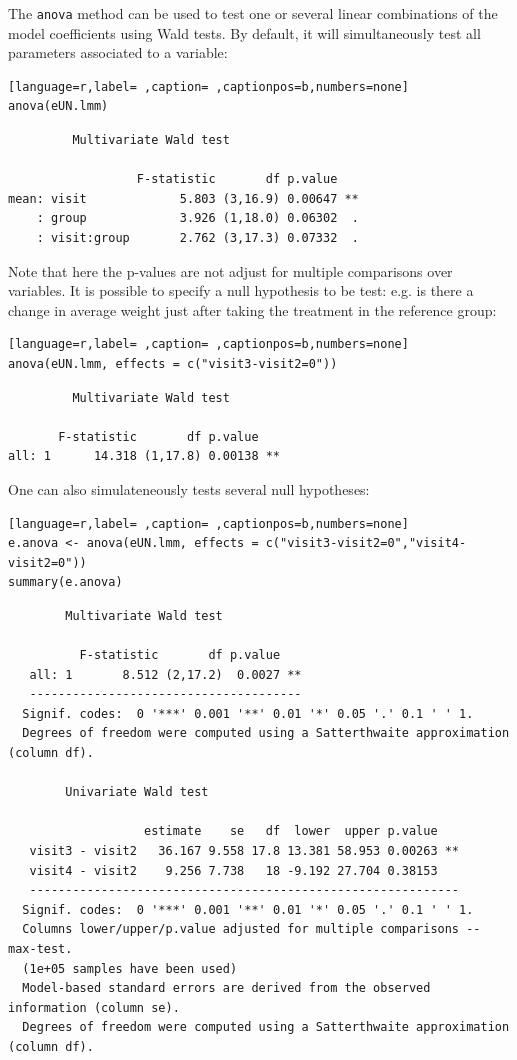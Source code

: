 \documentclass[12pt]{article}
\begin{document}
The \texttt{anova} method can be used to test one or several linear
combinations of the model coefficients using Wald tests. By default,
it will simultaneously test all parameters associated to a variable:
\begin{lstlisting}[language=r,label= ,caption= ,captionpos=b,numbers=none]
anova(eUN.lmm)
\end{lstlisting}

\begin{verbatim}
	     Multivariate Wald test 

                  F-statistic       df p.value   
mean: visit             5.803 (3,16.9) 0.00647 **
    : group             3.926 (1,18.0) 0.06302  .
    : visit:group       2.762 (3,17.3) 0.07332  .
\end{verbatim}


Note that here the p-values are not adjust for multiple comparisons
over variables. It is possible to specify a null hypothesis to be
test: e.g. is there a change in average weight just after taking the
treatment in the reference group:
\begin{lstlisting}[language=r,label= ,caption= ,captionpos=b,numbers=none]
anova(eUN.lmm, effects = c("visit3-visit2=0"))
\end{lstlisting}

\begin{verbatim}
	     Multivariate Wald test 

       F-statistic       df p.value   
all: 1      14.318 (1,17.8) 0.00138 **
\end{verbatim}


One can also simulateneously tests several null hypotheses:
\begin{lstlisting}[language=r,label= ,caption= ,captionpos=b,numbers=none]
e.anova <- anova(eUN.lmm, effects = c("visit3-visit2=0","visit4-visit2=0"))
summary(e.anova)
\end{lstlisting}

\begin{verbatim}
		Multivariate Wald test 

          F-statistic       df p.value   
   all: 1       8.512 (2,17.2)  0.0027 **
   -------------------------------------- 
  Signif. codes:  0 '***' 0.001 '**' 0.01 '*' 0.05 '.' 0.1 ' ' 1.
  Degrees of freedom were computed using a Satterthwaite approximation (column df). 

		Univariate Wald test 

                   estimate    se   df  lower  upper p.value   
   visit3 - visit2   36.167 9.558 17.8 13.381 58.953 0.00263 **
   visit4 - visit2    9.256 7.738   18 -9.192 27.704 0.38153   
   ------------------------------------------------------------ 
  Signif. codes:  0 '***' 0.001 '**' 0.01 '*' 0.05 '.' 0.1 ' ' 1.
  Columns lower/upper/p.value adjusted for multiple comparisons -- max-test.
  (1e+05 samples have been used)
  Model-based standard errors are derived from the observed information (column se). 
  Degrees of freedom were computed using a Satterthwaite approximation (column df).
\end{verbatim}
\end{document}
